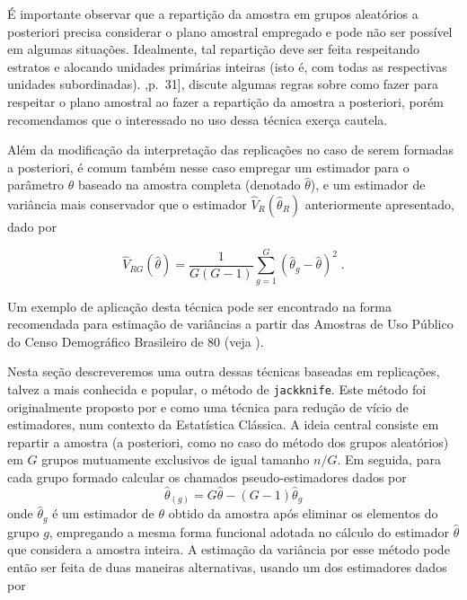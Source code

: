\documentclass[]{book}
\theoremstyle{definition}
\theoremstyle{definition}
\theoremstyle{definition}
\theoremstyle{remark}
\begin{document}
É importante observar que a repartição da amostra em grupos aleatórios a
posteriori precisa considerar o plano amostral empregado e pode não ser
possível em algumas situações. Idealmente, tal repartição deve ser feita
respeitando estratos e alocando unidades primárias inteiras (isto é, com
todas as respectivas unidades subordinadas). \citep{W85},p.~31{]},
discute algumas regras sobre como fazer para respeitar o plano amostral
ao fazer a repartição da amostra a posteriori, porém recomendamos que o
interessado no uso dessa técnica exerça cautela.

Além da modificação da interpretação das replicações no caso de serem
formadas a posteriori, é comum também nesse caso empregar um estimador
para o parâmetro \(\theta\) baseado na amostra completa (denotado
\(\widehat{\theta }\)), e um estimador de variância mais conservador que
o estimador \(\widehat{V}_{R}\left( \widehat{\theta }_{R}\right)\)
anteriormente apresentado, dado por

\begin{equation}
\widehat{V}_{RG}\left( \widehat{\theta }\right) =\frac{1}{G\left( G-1\right) 
}\sum_{g=1}^{G}\left( \widehat{\theta }_{g}-\widehat{\theta }\right) ^{2}\;.
\label{eq:estpa25}
\end{equation}

Um exemplo de aplicação desta técnica pode ser encontrado na forma
recomendada para estimação de variâncias a partir das Amostras de Uso
Público do Censo Demográfico Brasileiro de 80 (veja \citep{IBGE85}).

Nesta seção descreveremos uma outra dessas técnicas baseadas em
replicações, talvez a mais conhecida e popular, o método de
\texttt{jackknife}. Este método foi originalmente proposto por
\citep{Queno49} e \citep{Queno56} como uma técnica para redução de vício
de estimadores, num contexto da Estatística Clássica. A ideia central
consiste em repartir a amostra (a posteriori, como no caso do método dos
grupos aleatórios) em \(G\) grupos mutuamente exclusivos de igual
tamanho \(n/G\). Em seguida, para cada grupo formado calcular os
chamados pseudo-estimadores dados por \[
\widehat{\theta }_{\left( g\right) }=G\widehat{\theta }-\left( G-1\right) 
\widehat{\theta }_{g} 
\] onde \(\widehat{\theta }_{g}\) é um estimador de \(\theta\) obtido da
amostra após eliminar os elementos do grupo \(g\), empregando a mesma
forma funcional adotada no cálculo do estimador \(\widehat{\theta}\) que
considera a amostra inteira. A estimação da variância por esse método
pode então ser feita de duas maneiras alternativas, usando um dos
estimadores dados por
\end{document}
